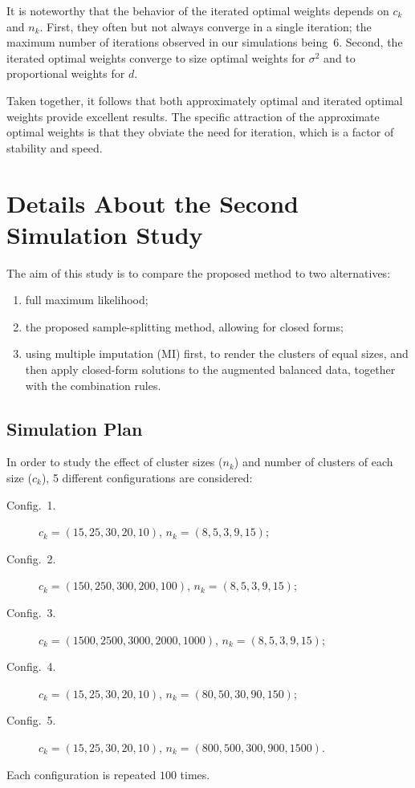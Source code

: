 \documentclass[11pt,a5paper,twoside]{book}
\begin{document}
{It is noteworthy that the behavior of the iterated optimal weights depends on $c_k$ and $n_k$. First, they often but not always converge in a single iteration; the maximum number of iterations observed in our simulations being~6. Second, the iterated optimal weights  converge to size optimal weights for $\sigma^2$ and to proportional weights for $d$.

Taken together, it follows that both approximately optimal and iterated optimal weights provide excellent results. The specific attraction of the approximate optimal weights is that they obviate the need for iteration, which is a factor of stability and speed.

\setcounter{equation}{0}
\section{Details About the Second Simulation Study}
\label{simapptwee}

The aim of this study is to compare the proposed method to two alternatives: 
\begin{enumerate}
\item full maximum likelihood;
\item the proposed  sample-splitting method, allowing for closed forms;
\item using multiple imputation (MI) first, to render the clusters of equal sizes, and then apply closed-form solutions to the augmented balanced data, together with the combination rules.
\end{enumerate}

\subsection{Simulation Plan}

In order to study the effect of cluster sizes ($n_k$) and number of clusters of each size ($c_k$), 5 different configurations are considered:
\begin{description}
\item[Config.~1.] $c_k=(15,25,30,20,10)$, $n_k=(8,5,3,9,15)$;
\item[Config.~2.] $c_k=(150,250,300,200,100)$, $n_k=(8,5,3,9,15)$;
\item[Config.~3.] $c_k=(1500,2500,3000,2000,1000)$, $n_k=(8,5,3,9,15)$;
\item[Config.~4.] $c_k=(15,25,30,20,10)$, $n_k=(80,50,30,90,150)$;
\item[Config.~5.] $c_k=(15,25,30,20,10)$, $n_k=(800,500,300,900,1500)$.
\end{description}
 Each configuration is repeated $100$ times.

}
\end{document}
